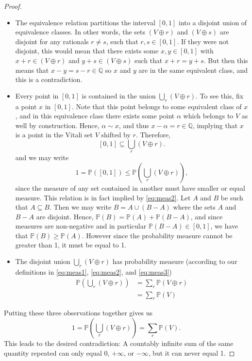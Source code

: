 \documentclass[
]{book}
\newcommand{\bbP}{\mathbb{P}}
\newcommand{\bbQ}{\mathbb{Q}}
\theoremstyle{definition}
\theoremstyle{definition}
\theoremstyle{definition}
\theoremstyle{definition}
\theoremstyle{remark}
\begin{document}
\begin{proof}
\begin{itemize}
\item
  The equivalence relation partitions the interval \([0,1]\) into a disjoint union of equivalence classes. In other words, the sets \((V \oplus r)\) and \((V \oplus s)\) are disjoint for any rationals \(r\neq s\), such that \(r,s\in[0,1]\). If they were not disjoint, this would mean that there exists some \(x,y\in[0,1]\) with \(x+r\in(V \oplus r)\) and \(y+s\in (V \oplus s)\) such that \(x+r=y+s\). But then this means that \(x-y=s-r\in\bbQ\) so \(x\) and \(y\) are in the same equivalent class, and this is a contradiction.
\item
  Every point in \([0,1]\) is contained in the union \(\bigcup_{r} (V \oplus r)\). To see this, fix a point \(x\) in \([0,1]\). Note that this point belongs to some equivalent class of \(x\), and in this equivalence class there exists some point \(\alpha\) which belongs to \(V\) as well by construction. Hence, \(\alpha \sim x\), and thus \(x-\alpha=r\in\bbQ\), implying that \(x\) is a point in the Vitali set \(V\) shifted by \(r\). Therefore, \[[0,1] \subseteq  \bigcup_{r} (V \oplus r).\] and we may write \[1 = \bbP([0,1]) \leq \bbP\left(\bigcup_{r} (V \oplus r)\right),\] since the measure of any set contained in another must have smaller or equal measure. This relation is in fact implied by \eqref{eq:meas2}. Let \(A\) and \(B\) be such that \(A \subseteq B\). Then we may write \(B = A \cup (B-A)\) where the sets \(A\) and \(B-A\) are disjoint. Hence, \(\bbP(B)=\bbP(A)+\bbP(B-A)\), and since measures are non-negative and in particular \(\bbP(B-A)\in[0,1]\), we have that \(\bbP(B)\geq \bbP(A)\). However since the probability measure cannot be greater than 1, it must be equal to 1.
\item
  The disjoint union \(\bigcup_{r} (V \oplus r)\) has probability measure (according to our definitions in \eqref{eq:meas1}, \eqref{eq:meas2}, and \eqref{eq:meas3})
  \begin{align*}
   \bbP\left(\bigcup_{r} (V \oplus r)\right) 
   &= \sum_r \bbP(V \oplus r) \\
   &= \sum_r \bbP(V) 
   \end{align*}
\end{itemize}

Putting these three observations together gives us
\[
1 = \bbP\left(\bigcup_{r} (V \oplus r)\right)  = \sum_r \bbP(V).
\]
This leads to the desired contradiction: A countably infinite sum of the same quantity repeated can only equal 0, \(+\infty\), or \(-\infty\), but it can never equal 1.
\end{proof}
\end{document}
